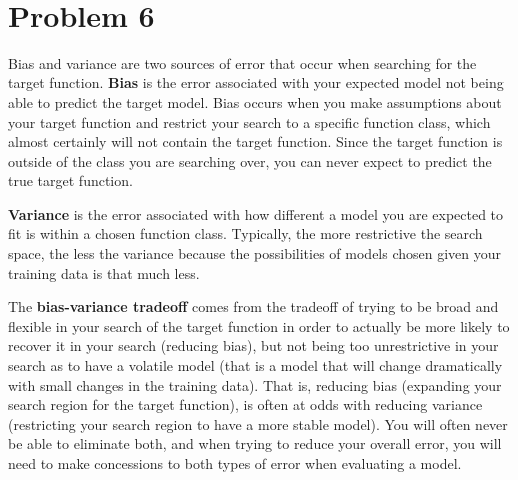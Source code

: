 \documentclass[11pt]{article}
\begin{document}
\newpage
\begin{center}
\ \\
\end{center}

\section*{Problem 6}

\vspace{5 mm}
\noindent
Bias and variance are two sources of error that occur when searching for the 
target function. {\bf Bias} is the error associated with your expected model 
not being able to predict the target model. Bias occurs when you make 
assumptions about your target function and restrict your search to a specific 
function class, which almost certainly will not contain the target function. 
Since the target function is outside of the class you are searching over, you 
can never expect to predict the true target function.

\vspace{5 mm}
\noindent
{\bf Variance} is the error associated with how different a model you are 
expected to fit is within a chosen function class. Typically, the more 
restrictive the search space, the less the variance because the possibilities of 
models chosen given your training data is that much less.

\vspace{5 mm}
\noindent
The {\bf bias-variance tradeoff} comes from the tradeoff of trying to be broad 
and flexible in your search of the target function in order to actually be more 
likely to recover it in your search (reducing bias), but not being too 
unrestrictive in your search as to have a volatile model (that is a model that 
will change dramatically with small changes in the training data). That is, 
reducing bias (expanding your search region for the target function), is often 
at odds with reducing variance (restricting your search region to have a more 
stable model). You will often never be able to eliminate both, and when trying 
to reduce your overall error, you will need to make concessions to both types 
of error when evaluating a model.
\end{document}
